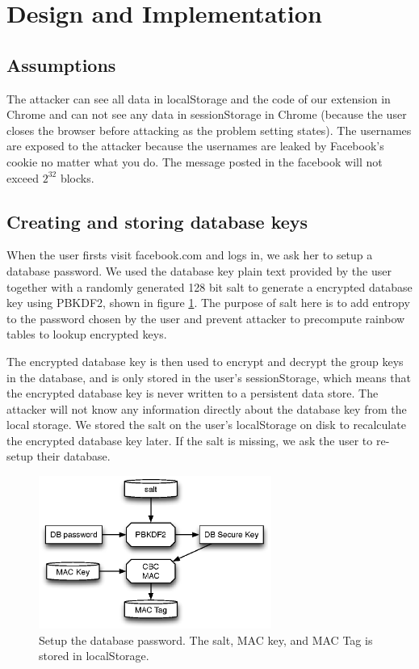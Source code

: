 \section{Design and Implementation}
\subsection{Assumptions}
The attacker can see all data in localStorage and the code of our extension in Chrome and can not see any data in sessionStorage in Chrome (because the user closes the browser before attacking as the problem setting states).
The usernames are exposed to the attacker because the usernames are leaked by Facebook's cookie no matter what you do. 
The message posted in the facebook will not exceed $2^{32}$ blocks. 

\subsection{Creating and storing database keys}

When the user firsts visit facebook.com and logs in, we ask her to setup a database password. We used the database key plain text provided by the user together with a randomly generated 128 bit salt to generate a encrypted database key using PBKDF2, shown in figure \ref{fig:dbkeys}. The purpose of salt here is to add entropy to the password chosen by the user and prevent attacker to precompute rainbow tables to lookup encrypted keys. 

The encrypted database key is then used to encrypt and decrypt the group keys in the database, and is only stored in the user's sessionStorage, which means that the encrypted database key is never written to a persistent data store. The attacker will not know any information directly about the database key from the local storage. We stored the salt on the user's localStorage on disk to recalculate the encrypted database key later. If the salt is missing, we ask the user to re-setup their database. 

\begin{figure}[h!]
\centering
\caption{Setup the database password. The salt, MAC key, and MAC Tag is stored in localStorage.}
\label{fig:dbkeys}
\includegraphics[height=5cm]{fig/dbkeys.eps}
\end{figure}

